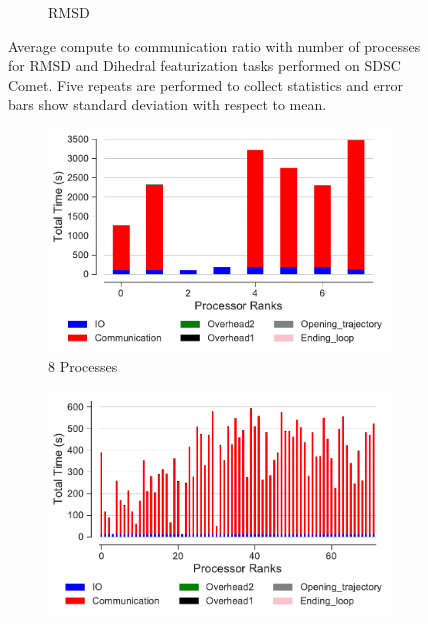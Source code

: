 \begin{figure}[ht!]
\begin{subfigure} {.4\textwidth}
  \caption{RMSD}
  \label{fig:tcomp_tcomm_ratio_rmsd}
\end{subfigure}
%
\caption{Average compute to communication ratio with number of processes for RMSD and Dihedral featurization tasks performed on SDSC Comet.
Five repeats are performed to collect statistics and error bars show standard deviation with respect to mean.}
\label{fig:tcomp_tcomm_ratio}
\end{figure} 

\begin{figure}[ht!]
\centering
\begin{subfigure}{.47\textwidth}
  \includegraphics[width=\linewidth]{figures/main-dihedral-BarPlot-rank-comm-comparison_8_5.pdf}
  \caption{8 Processes}
  \label{fig:comm-rank-dihed-8}
\end{subfigure}
\bigskip
\begin{subfigure} {.47\textwidth}
  \includegraphics[width=\linewidth]{figures/main-dihedral-BarPlot-rank-comm-comparison_72_5.pdf}

\end{subfigure}
\end{figure}
